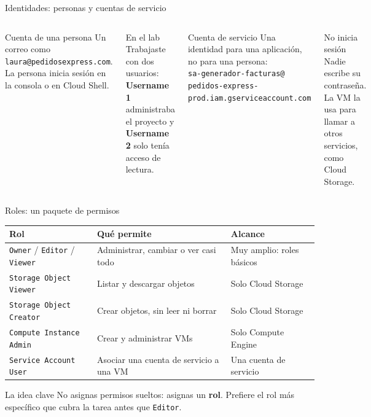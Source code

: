 \documentclass[aspectratio=169,10pt,c]{beamer}
\begin{document}
\begin{frame}{Identidades: personas y cuentas de servicio}
\begin{columns}[T,onlytextwidth]
\begin{block}{Cuenta de una persona}
\small Un correo como \texttt{laura@pedidosexpress.com}. La persona inicia sesión en la consola o en Cloud Shell.
\end{block}
\begin{exampleblock}{En el lab}
\small Trabajaste con dos usuarios: \textbf{Username 1} administraba el proyecto y \textbf{Username 2} solo tenía acceso de lectura.
\end{exampleblock}
\begin{block}{Cuenta de servicio}
\small Una identidad para una aplicación, no para una persona: \\\texttt{\footnotesize sa-generador-facturas@\\pedidos-express-prod.iam.gserviceaccount.com}
\end{block}
\begin{alertblock}{No inicia sesión}
\small Nadie escribe su contraseña. La VM la usa para llamar a otros servicios, como Cloud Storage.
\end{alertblock}
\end{columns}
\end{frame}

\begin{frame}{Roles: un paquete de permisos}
\renewcommand{\arraystretch}{1.3}
\centering\small
\begin{tabular}{@{}p{4.3cm}p{4.6cm}p{3.6cm}@{}}
\toprule
\textbf{Rol} & \textbf{Qué permite} & \textbf{Alcance}\\
\midrule
\texttt{Owner} / \texttt{Editor} / \texttt{Viewer} & Administrar, cambiar o ver casi todo & Muy amplio: roles básicos\\
\texttt{Storage Object Viewer} & Listar y descargar objetos & Solo Cloud Storage\\
\texttt{Storage Object Creator} & Crear objetos, sin leer ni borrar & Solo Cloud Storage\\
\texttt{Compute Instance Admin} & Crear y administrar VMs & Solo Compute Engine\\
\texttt{Service Account User} & Asociar una cuenta de servicio a una VM & Una cuenta de servicio\\
\bottomrule
\end{tabular}
\par\vspace{3mm}
\begin{alertblock}{La idea clave}
\small No asignas permisos sueltos: asignas un \textbf{rol}. Prefiere el rol más específico que cubra la tarea antes que \texttt{Editor}.
\end{alertblock}
\end{frame}
\end{document}
